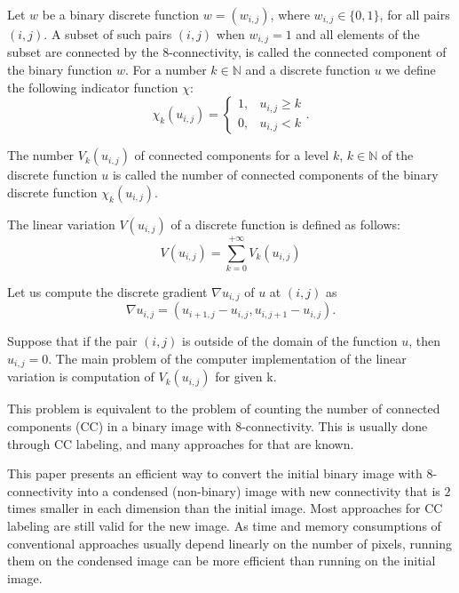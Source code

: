 \documentclass[hidelinks]{llncs}
\newcommand*{\N}{\mathbb{N} \xspace}
\begin{document}
Let $w$ be a binary discrete function $w=(w_{i,j})$, where $w_{i,j} \in
\{0,1\}$, for all pairs $(i,j)$. A subset of such pairs $(i, j)$ when
$w_{i,j}=1$ and all elements of the subset are connected by the 8-connectivity,
is called the connected component of the binary function $w$. For a number $k
\in \N$ and a discrete function $u$ we define the following indicator function
$\chi$:
\begin{equation}
  \chi_k (u_{i,j}) =
    \begin{cases}
      1, & u_{i,j} \ge k \\
      0, & u_{i,j} < k
    \end{cases}.
  \label{eq:chiIndicator}
\end{equation}

\begin{definition}
  The number $V_k(u_{i,j})$ of connected components for a level $k$, $k \in \N$
  of the discrete function $u$ is called the number of connected components of
  the binary discrete function $\chi_k(u_{i,j})$.
\end{definition}

\begin{definition}
  The linear variation $V(u_{i,j})$ of a discrete function  is defined as follows:
  \begin{equation}
    V(u_{i,j}) = \sum_{k=0}^{+\infty} V_k(u_{i,j})
    \label{eq:V}
  \end{equation}
\end{definition}

Let us compute the discrete gradient $\nabla u_{i,j}$ of $u$ at $(i,j)$ as
\begin{equation}
  \nabla u_{i,j} = (u_{i+1,j} - u_{i,j}, u_{i,j+1} - u_{i,j}).
  \label{eq:gradient}
\end{equation}

Suppose that if the pair $(i,j)$ is outside of the domain of the function $u$, then 
$u_{i,j} = 0$.
The main problem of the computer implementation of the linear variation is 
computation of $V_k(u_{i,j})$ for given k.


This problem is equivalent to the problem of counting the number of connected
components (CC) in a binary image with 8-connectivity.
This is usually done through CC labeling, and many approaches for that are
known\cite{hechao}.

This paper presents an efficient way to convert the initial binary image with
8-connectivity into a condensed (non-binary) image with new connectivity that
is $2$ times smaller in each dimension than the initial image. Most approaches
for CC labeling are still valid for the new image. As time and memory
consumptions of conventional approaches usually depend linearly on the number
of pixels, running them on the condensed image can be more efficient than
running on the initial image.
\end{document}
